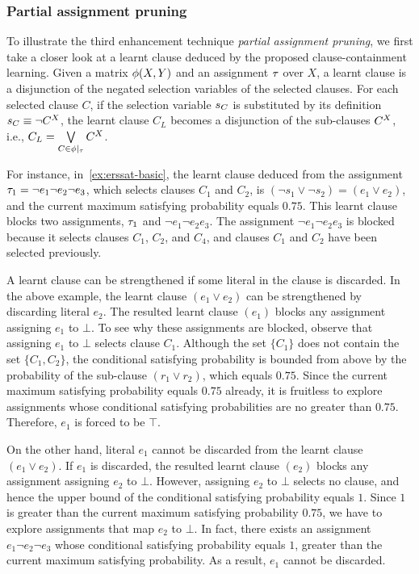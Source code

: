 \subsubsection{Partial assignment pruning}
To illustrate the third enhancement technique \textit{partial assignment pruning},
we first take a closer look at a learnt clause deduced by the proposed clause-containment learning.
Given a matrix $\phi(X,Y)$ and an assignment $\tau$ over $X$,
a learnt clause is a disjunction of the negated selection variables of the selected clauses.
For each selected clause $C$,
if the selection variable $s_{C}$ is substituted by its definition $s_{C}\equiv\lnot C^X$,
the learnt clause $C_L$ becomes a disjunction of the sub-clauses $C^X$,
i.e., $C_L=\bigvee\limits_{C\in\phi|_{\tau}}C^X$.

For instance, in~\cref{ex:erssat-basic},
the learnt clause deduced from the assignment $\tau_1=\lnot e_1 \lnot e_2 \lnot e_3$,
which selects clauses $C_1$ and $C_2$,
is $(\lnot s_1 \lor \lnot s_2)=(e_1 \lor e_2)$,
and the current maximum satisfying probability equals $0.75$.
This learnt clause blocks two assignments, $\tau_1$ and $\lnot e_1 \lnot e_2 e_3$.
The assignment $\lnot e_1 \lnot e_2 e_3$ is blocked
because it selects clauses $C_1$, $C_2$, and $C_4$,
and clauses $C_1$ and $C_2$ have been selected previously.

A learnt clause can be strengthened if some literal in the clause is discarded.
In the above example,
the learnt clause $(e_1 \lor e_2)$ can be strengthened by discarding literal $e_2$.
The resulted learnt clause $(e_1)$ blocks any assignment assigning $e_1$ to $\bot$.
To see why these assignments are blocked,
observe that assigning $e_1$ to $\bot$ selects clause $C_1$.
Although the set $\{C_1\}$ does not contain the set $\{C_1,C_2\}$,
the conditional satisfying probability is bounded from above by the probability of the sub-clause $(r_1 \lor r_2)$,
which equals $0.75$.
Since the current maximum satisfying probability equals $0.75$ already,
it is fruitless to explore assignments whose conditional satisfying probabilities are no greater than $0.75$. Therefore, $e_1$ is forced to be $\top$.

On the other hand,
literal $e_1$ cannot be discarded from the learnt clause $(e_1 \lor e_2)$.
If $e_1$ is discarded,
the resulted learnt clause $(e_2)$ blocks any assignment assigning $e_2$ to $\bot$.
However, assigning $e_2$ to $\bot$ selects no clause,
and hence the upper bound of the conditional satisfying probability equals $1$.
Since $1$ is greater than the current maximum satisfying probability $0.75$,
we have to explore assignments that map $e_2$ to $\bot$.
In fact, there exists an assignment $e_1 \lnot e_2 \lnot e_3$ whose conditional satisfying probability equals $1$,
greater than the current maximum satisfying probability.
As a result, $e_1$ cannot be discarded.

